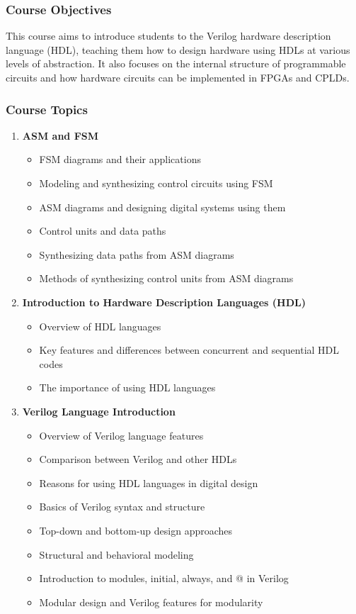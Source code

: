 \documentclass[12pt]{article}
\begin{document}
\subsubsection*{Course Objectives}
This course aims to introduce students to the Verilog hardware description language (HDL), teaching them how to design hardware using HDLs at various levels of abstraction. It also focuses on the internal structure of programmable circuits and how hardware circuits can be implemented in FPGAs and CPLDs.

\subsubsection*{Course Topics}
\begin{enumerate}
    \item \textbf{ASM and FSM}
        \begin{itemize}
            \item FSM diagrams and their applications
            \item Modeling and synthesizing control circuits using FSM
            \item ASM diagrams and designing digital systems using them
            \item Control units and data paths
            \item Synthesizing data paths from ASM diagrams
            \item Methods of synthesizing control units from ASM diagrams
        \end{itemize}
    
    \item \textbf{Introduction to Hardware Description Languages (HDL)}
        \begin{itemize}
            \item Overview of HDL languages
            \item Key features and differences between concurrent and sequential HDL codes
            \item The importance of using HDL languages
        \end{itemize}
    
    \item \textbf{Verilog Language Introduction}
        \begin{itemize}
            \item Overview of Verilog language features
            \item Comparison between Verilog and other HDLs
            \item Reasons for using HDL languages in digital design
            \item Basics of Verilog syntax and structure
            \item Top-down and bottom-up design approaches
            \item Structural and behavioral modeling
            \item Introduction to modules, initial, always, and @ in Verilog
            \item Modular design and Verilog features for modularity
        \end{itemize}
    

\end{enumerate}
\end{document}
